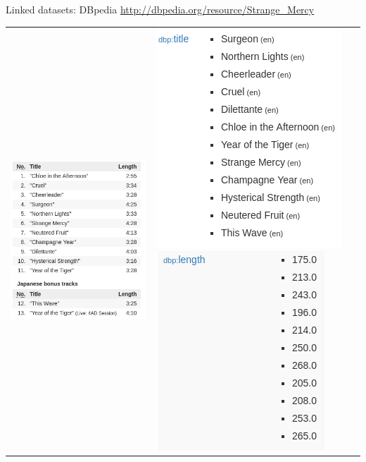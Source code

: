 \documentclass{beamer}
\begin{document}
\begin{frame}{Linked datasets: DBpedia}
\url{http://dbpedia.org/resource/Strange_Mercy}
\vspace{1cm}

\begin{tabular}{l|l}
\includegraphics[width=.32\textwidth]{strange_mercy3.png}
&
\includegraphics[width=.32\textwidth]{dbpedia3a.png}
\includegraphics[width=.32\textwidth]{dbpedia3b.png}
\end{tabular}
\end{frame}
\end{document}

